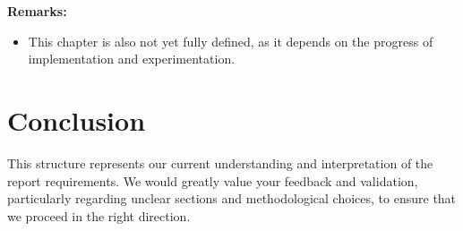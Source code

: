 \documentclass[12pt]{article}
\begin{document}
\textbf{Remarks:}
\begin{itemize}
    \item This chapter is also not yet fully defined, as it depends on the progress of implementation and experimentation.
\end{itemize}

\section*{Conclusion}
This structure represents our current understanding and interpretation of the report requirements. We would greatly value your feedback and validation, particularly regarding unclear sections and methodological choices, to ensure that we proceed in the right direction.
\end{document}
